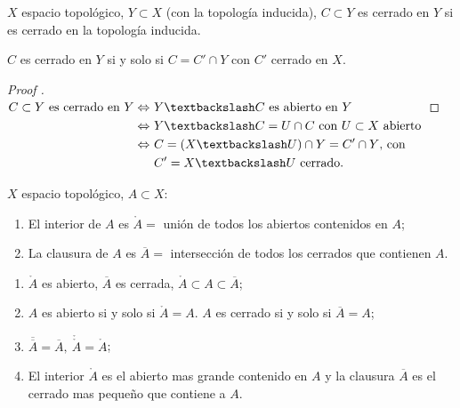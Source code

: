\begin{definition}
	$X$ espacio topológico, $Y \subset X$ (con la topología inducida), $C \subset Y$ es cerrado en $Y$ si es cerrado en la topología inducida.
\end{definition}

\begin{lemma}
	$C$ es cerrado en $Y$ si y solo si $C = C' \cap Y$ con $C'$ cerrado en $X$.
\end{lemma}

\begin{proof}[Proof ]
	$\begin{aligned}[t]
		C \subset Y \text{ es cerrado en } Y \iff \ & Y \textbackslash C \text{ es abierto en } Y \\
		\iff \ & Y \textbackslash C = U \cap C \text{ con } U \subset X \text{ abierto} \\
		\iff \ & C = (X \textbackslash U) \cap Y = C' \cap Y \text{, con } \\
		& C' = X \textbackslash U \text{ cerrado}
	.\end{aligned}$
\end{proof}

\begin{definition}
	$X$ espacio topológico, $A \subset X$:
	\begin{enumerate}
		\item El interior de $A$ es $\mathring{A} =$ unión de todos los abiertos contenidos en $A$;

		\item La clausura de $A$ es $\overline{A} =$ intersección de todos los cerrados que contienen $A$.
	\end{enumerate}
\end{definition}

\begin{remark}
	\text{ }
	\begin{enumerate}
		\item $\mathring{A}$ es abierto, $\overline{A}$ es cerrada, $\mathring{A} \subset A \subset \overline{A}$;

		\item $A$ es abierto si y solo si $\mathring{A} = A$. $A$ es cerrado si y solo si $\overline{A} = A$;

		\item $\overline{\overline{A}} = \overline{A}, \ \mathring{\mathring{A}} = \mathring{A}$;

		\item El interior $\mathring{A}$ es el abierto mas grande contenido en $A$ y la clausura $\overline{A}$ es el cerrado mas pequeño que contiene a $A$.
	\end{enumerate}
\end{remark}

